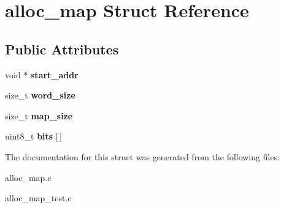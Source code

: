 \hypertarget{structalloc__map}{}\section{alloc\+\_\+map Struct Reference}
\label{structalloc__map}
\subsection*{Public Attributes}
\begin{DoxyCompactItemize}
\item 
\hypertarget{structalloc__map_a5369c225ec91e1ff91eb944ef62b1984}{}void $\ast$ {\bfseries start\+\_\+addr}\label{structalloc__map_a5369c225ec91e1ff91eb944ef62b1984}

\item 
\hypertarget{structalloc__map_a5ea24384473e323240d60a5858b03775}{}size\+\_\+t {\bfseries word\+\_\+size}\label{structalloc__map_a5ea24384473e323240d60a5858b03775}

\item 
\hypertarget{structalloc__map_a02ce00f66fbf036ead3547a919768b7a}{}size\+\_\+t {\bfseries map\+\_\+size}\label{structalloc__map_a02ce00f66fbf036ead3547a919768b7a}

\item 
\hypertarget{structalloc__map_a19fbce4a67826976764185e938807023}{}uint8\+\_\+t {\bfseries bits} \mbox{[}$\,$\mbox{]}\label{structalloc__map_a19fbce4a67826976764185e938807023}

\end{DoxyCompactItemize}


The documentation for this struct was generated from the following files\+:\begin{DoxyCompactItemize}
\item 
alloc\+\_\+map.\+c\item 
alloc\+\_\+map\+\_\+test.\+c\end{DoxyCompactItemize}

